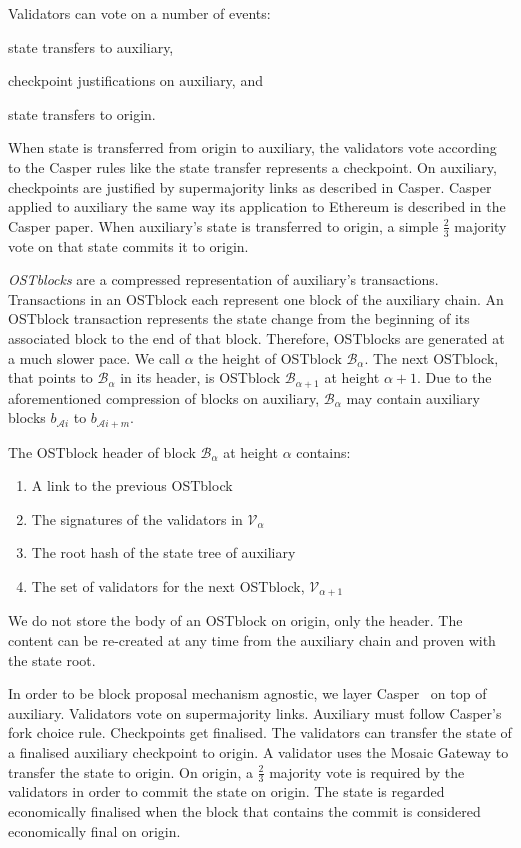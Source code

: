 \documentclass[12pt,a4paper]{article}
\newcommand{\A}{\mathcal{A}}
\newcommand{\V}{\mathcal{V}}
\newcommand{\B}{\mathcal{B}}
\begin{document}
Validators can vote on a number of events:
\begin{inparaenum}[(a)]
	\item state transfers to auxiliary,
	\item checkpoint justifications on auxiliary, and
 	\item state transfers to origin.
\end{inparaenum}
When state is transferred from origin to auxiliary,
the validators vote according to the Casper rules like the state transfer represents a checkpoint.
On auxiliary, checkpoints are justified by supermajority links as described in Casper.
Casper applied to auxiliary the same way its application to Ethereum is described in the Casper paper.
When auxiliary's state is transferred to origin, a simple $\frac{2}{3}$ majority vote on that state commits it to origin.

\emph{OSTblocks} are a compressed representation of auxiliary's transactions.
Transactions in an OSTblock each represent one block of the auxiliary chain.
An OSTblock transaction represents the state change from the beginning of its associated block to the end of that block.
Therefore, OSTblocks are generated at a much slower pace.
We call $\alpha$ the height of OSTblock $\B_\alpha$.
The next OSTblock, that points to $\B_\alpha$ in its header,
is OSTblock $\B_{\alpha+1}$ at height $\alpha+1$.
Due to the aforementioned compression of blocks on auxiliary,
$\B_\alpha$ may contain auxiliary blocks $b_{\A{}i}$ to $b_{\A{}i+m}$.

The OSTblock header of block $\B_\alpha$ at height $\alpha$ contains:
\begin{enumerate}
	\item A link to the previous OSTblock
	\item The signatures of the validators in $\V_\alpha$
	\item The root hash of the state tree of auxiliary
	\item The set of validators for the next OSTblock, $\V_{\alpha+1}$
\end{enumerate}
We do not store the body of an OSTblock on origin, only the header.
The content can be re-created at any time from the auxiliary chain and proven with the state root.

In order to be block proposal mechanism agnostic, we layer Casper~\cite{casperffg} on top of auxiliary.
Validators vote on supermajority links.
Auxiliary must follow Casper's fork choice rule.
Checkpoints get finalised.
The validators can transfer the state of a finalised auxiliary checkpoint to origin.
A validator uses the Mosaic Gateway to transfer the state to origin.
On origin, a $\frac{2}{3	}$ majority vote is required by the validators in order to commit the state on origin.
The state is regarded economically finalised when the block that contains the commit is considered economically final on origin.
\end{document}
